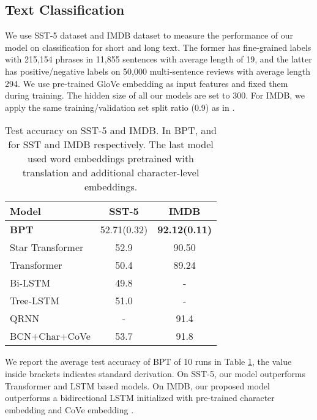 \documentclass[11pt,a4paper]{article}
\begin{document}
\subsection{Text Classification}

We use SST-5 dataset \citep{socher2013recursive} and IMDB dataset \citep{maas2011learning} to measure the performance of our model on classification for short and long text.  The former has fine-grained labels with 215,154 phrases in 11,855 sentences with average length of 19, and the latter has positive/negative labels on 50,000 multi-sentence reviews with average length 294.
We use pre-trained GloVe embedding \citep{pennington2014glove} as input features and fixed them during training.
The hidden size of all our models are set to 300.
For IMDB, we apply the same training/validation set split ratio (0.9) as in \citet{mccann2017learned}.

\begin{table}[!htb]
\small\setlength{\tabcolsep}{2pt}
\centering
\begin{tabular}{p{14em}cc}
\toprule
Model                          & SST-5 & IMDB                  \\ \midrule
\bf BPT & 52.71(0.32)       & \bf 92.12(0.11) \\
Star Transformer         & 52.9 & 90.50 \\
Transformer              & 50.4 & 89.24 \\
Bi-LSTM \citep{li2015tree}                  & 49.8 & - \\
Tree-LSTM \citep{socher2013recursive}                & 51.0 & -\\
QRNN \cite{DBLP:conf/iclr/0002MXS17} & - & 91.4  \\ \midrule
BCN+Char+CoVe \cite{mccann2017learned}      & 53.7 & 91.8          \\
\bottomrule
\end{tabular}
\caption{Test accuracy on SST-5 and IMDB. In BPT,  and  for SST and IMDB respectively. The last model used word embeddings pretrained with translation and additional character-level embeddings. }
\label{tbl:classification}
\end{table}

We report the average test accuracy of BPT of 10 runs in Table \ref{tbl:classification}, the value inside brackets indicates standard derivation. On SST-5, our model outperforms Transformer and LSTM based models. On IMDB, our proposed model outperforms a bidirectional LSTM initialized with pre-trained character embedding and CoVe embedding \cite{mccann2017learned}.
\end{document}

